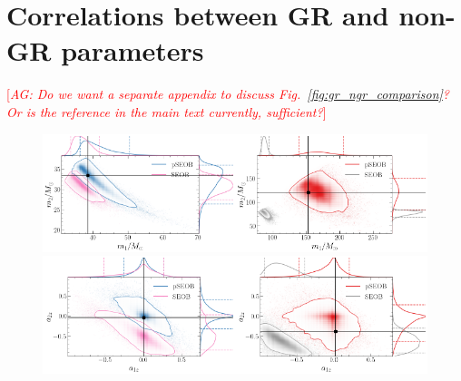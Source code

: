 \documentclass[twocolumn,prd,superscriptaddress,amsfonts,amssymb,amsmath,preprintnumbers]{revtex4-1}
\newcommand{\abhi}[1]{\textcolor{red}{[\textit{AG: #1}]}}
\begin{document}
\section{Correlations between GR and non-GR parameters}\label{sec:correlations}
\abhi{Do we want a separate appendix to discuss Fig.~\ref{fig:gr_ngr_comparison}? Or is the reference in the main text currently, sufficient?}

\begin{figure}[h!]
	\includegraphics[width=0.5\textwidth]{figures/GW150914_simulated_signal_0p5_gr_ngr_m1m2.png}\includegraphics[width=0.5\textwidth]{figures/GW190521_simulated_signal_0p5_gr_ngr_m1m2.png}
	\includegraphics[width=0.5\textwidth]{figures/GW150914_simulated_signal_0p5_gr_ngr_a1za2z.png}\includegraphics[width=0.5\textwidth]{figures/GW190521_simulated_signal_0p5_gr_ngr_a1za2z.png}	

\end{figure}
\end{document}
